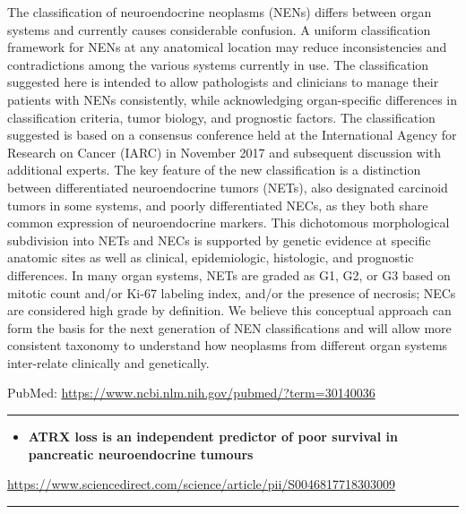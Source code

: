 \documentclass[]{article}
\providecommand{\tightlist}{%
  \setlength{\itemsep}{0pt}\setlength{\parskip}{0pt}}
\begin{document}
The classification of neuroendocrine neoplasms (NENs) differs between
organ systems and currently causes considerable confusion. A uniform
classification framework for NENs at any anatomical location may reduce
inconsistencies and contradictions among the various systems currently
in use. The classification suggested here is intended to allow
pathologists and clinicians to manage their patients with NENs
consistently, while acknowledging organ-specific differences in
classification criteria, tumor biology, and prognostic factors. The
classification suggested is based on a consensus conference held at the
International Agency for Research on Cancer (IARC) in November 2017 and
subsequent discussion with additional experts. The key feature of the
new classification is a distinction between differentiated
neuroendocrine tumors (NETs), also designated carcinoid tumors in some
systems, and poorly differentiated NECs, as they both share common
expression of neuroendocrine markers. This dichotomous morphological
subdivision into NETs and NECs is supported by genetic evidence at
specific anatomic sites as well as clinical, epidemiologic, histologic,
and prognostic differences. In many organ systems, NETs are graded as
G1, G2, or G3 based on mitotic count and/or Ki-67 labeling index, and/or
the presence of necrosis; NECs are considered high grade by definition.
We believe this conceptual approach can form the basis for the next
generation of NEN classifications and will allow more consistent
taxonomy to understand how neoplasms from different organ systems
inter-relate clinically and genetically.

PubMed: \url{https://www.ncbi.nlm.nih.gov/pubmed/?term=30140036}

{}

{}

\begin{center}\rule{0.5\linewidth}{\linethickness}\end{center}

\begin{itemize}
\tightlist
\item
  \textbf{ATRX loss is an independent predictor of poor survival in
  pancreatic neuroendocrine tumours}
\end{itemize}

\url{https://www.sciencedirect.com/science/article/pii/S0046817718303009}

\begin{center}\rule{0.5\linewidth}{\linethickness}\end{center}
\end{document}
